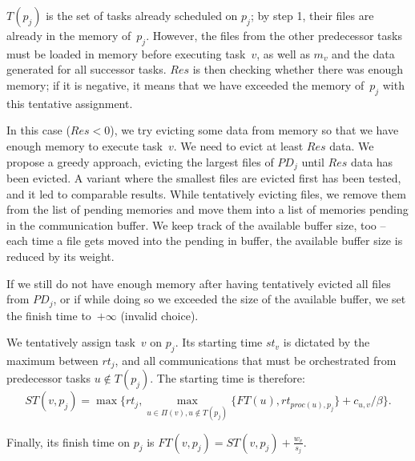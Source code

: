 \documentclass[conference]{IEEEtran}
\newcommand{\PD}{PD}
\newcommand{\AB}[1]{{\color{purple}[AB: #1]}}
\begin{document}
$T(p_j)$ is the set of tasks already scheduled on $p_j$; by step 1, their files are
already in the memory of~$p_j$. However, the files from the
other predecessor tasks must be loaded in memory before executing task~$v$,
as well as $m_v$ and the data generated for all successor tasks.
$Res$ is then checking whether there was enough memory; if it is negative,
it means that we have exceeded the memory of~$p_j$ with this tentative
assignment.

In this case ($Res <0$), we try evicting
some data from memory so that we have enough memory to execute task~$v$.
We need to evict at least $Res$ data.
We propose a greedy approach, evicting the largest files of $\PD_j$ until $Res$ data has been evicted. 
A variant where the smallest files are evicted first has been tested, and it led to comparable results. 
%    
While tentatively evicting files, we remove them from the list of pending memories and move them into a list
of memories pending in the communication buffer.
We keep track of the available buffer size, too -- each time a file gets moved into the pending in buffer, 
the available buffer size is reduced by its weight.

If we still do not have enough memory after having tentatively evicted all files from $\PD_j$,
or if while doing so we exceeded the size of the available buffer,
we set the finish time to~$+\infty$ (invalid choice).

\smallskip
{} We tentatively assign task~$v$ on $p_j$.
Its starting time $st_v$ is dictated by the maximum between $rt_j$, and all communications that
must be orchestrated from predecessor tasks $u\notin T(p_j)$.
The starting time is therefore:\\[-.7cm]

{\footnotesize{ \[ST(v, p_j) = \max{ \{rt_j, \max_{ u \in \Pi(v), u\notin T(p_j)}\{ FT(u) , rt_{proc(u), p_j}\} + c_{u,v} / \beta \} .} \]}}

\noindent  Finally, its finish time on $p_j$ is 
$FT(v,p_j) = ST(v, p_j) + \frac{w_v}{s_j}$.
\end{document}
